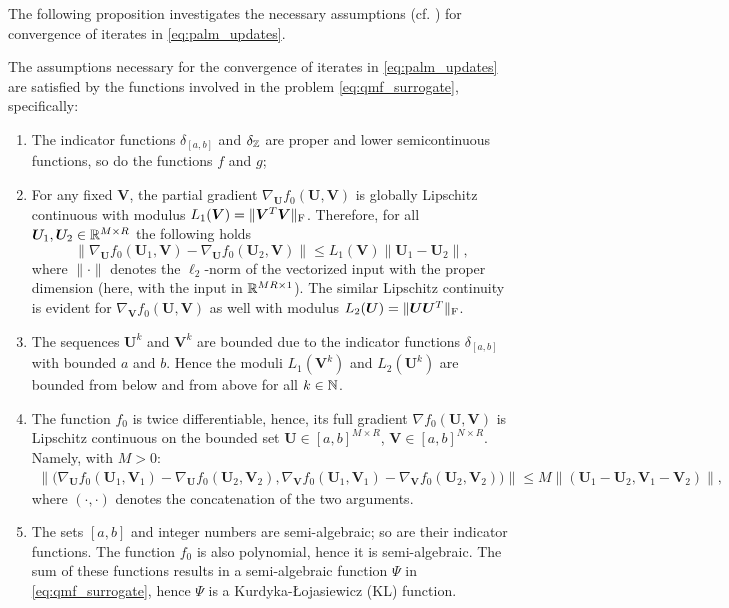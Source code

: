The following proposition investigates the necessary assumptions (cf. \cite[Asm. 1 and Asm. 2]{bolte2014proximal}) for convergence of iterates in \eqref{eq:palm_updates}.
\begin{prop}\label{prop:assumptions}
    The assumptions necessary for the convergence of iterates in \eqref{eq:palm_updates} are satisfied by the functions involved in the problem \eqref{eq:qmf_surrogate}, specifically:
    \begin{enumerate}
        \item The indicator functions $\delta_{[a,b]}$ and $\delta_{\mathbb{Z}}$ are proper and lower semicontinuous functions, so do the functions $f$ and $g$;
        \item For any fixed $\bm V$, the partial gradient $\nabla_{\bm U} f_0(\bm U, \bm V)$ is globally Lipschitz continuous with modulus $L_1(\bm V) = \|\bm V^T \bm V\|_{\rm F}$. Therefore, for all $\bm U_1,\bm U_2 \in \mathbb{R}^{M\times R}$ the following holds
              \begin{equation*}
                  \|\nabla_{\bm U} f_0(\bm U_1, \bm V) - \nabla_{\bm U} f_0(\bm U_2, \bm V)\| \leq L_1(\bm V) \|\bm U_1 - \bm U_2\|,
              \end{equation*}
              where $\|\cdot\|$ denotes the $\ell_2$-norm of the vectorized input with the proper dimension (here, with the input in $\mathbb{R}^{MR\times 1}$).
              The similar Lipschitz continuity is evident for $\nabla_{\bm V} f_0(\bm U, \bm V)$ as well with modulus $L_2(\bm U) = \|\bm U \bm U^T\|_{\rm F}$.
        \item The sequences $\bm U^k$ and $\bm V^k$ are bounded due to the indicator functions $\delta_{[a,b]}$ with bounded $a$ and $b$. Hence the moduli $L_1(\bm V^k)$ and $L_2(\bm U^k)$ are bounded from below and from above for all $k\in\mathbb{N}$.
        \item The function $f_0$ is twice differentiable, hence, its full gradient $\nabla f_0(\bm U,\bm V)$ is Lipschitz continuous on the bounded set $\bm U \in [a,b]^{M\times R}$, $\bm V \in [a,b]^{N\times R}$. Namely, with $M > 0$:
              \begin{align*}
                  \|\big(\nabla_{\bm U} f_0(\bm U_1, \bm V_1) - \nabla_{\bm U}  f_0(\bm U_2, \bm V_2),                             
                  \nabla_{\bm V} f_0(\bm U_1, \bm V_1)                          - \nabla_{\bm V} f_0(\bm U_2, \bm V_2)\big)\|      
                                                                                \leq M \|(\bm U_1 - \bm U_2, \bm V_1 - \bm V_2)\|,
              \end{align*}
              where $(\cdot,\cdot)$ denotes the concatenation of the two arguments.
        \item The sets $[a,b]$ and integer numbers are semi-algebraic; so are their indicator functions. The function $f_0$ is also polynomial, hence it is semi-algebraic. The sum of these functions results in a semi-algebraic function $\Psi$ in \eqref{eq:qmf_surrogate}, hence $\Psi$ is a Kurdyka-Łojasiewicz (KL) function.
    \end{enumerate}
\end{prop}
